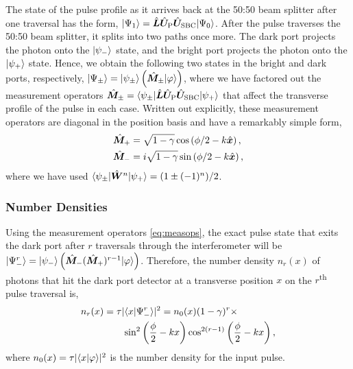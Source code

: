 The state of the pulse profile as it arrives back at the 50:50 beam splitter after one traversal has the form, $\lvert \Psi_1\rangle = \hat{\bm L}\hat{\bm U}_{\text{P}}\hat{\bm U}_{\text{SBC}}\lvert \Psi_0\rangle$.  After the pulse traverses the 50:50 beam splitter, it splits into two paths once more.  The dark port projects the photon onto the $\lvert \psi_-\rangle$ state, and the bright port projects the photon onto the $\lvert \psi_+\rangle$ state.  Hence, we obtain the following two states in the bright and dark ports, respectively, $\lvert \Psi_\pm\rangle = \lvert \psi_\pm\rangle \left(\hat{\bm M}_\pm \lvert \varphi\rangle \right)$, where we have factored out the measurement operators $\hat{\bm M}_\pm = \langle \psi_\pm \rvert \hat{\bm L} \hat{\bm U}_{\text{P}} \hat{\bm U}_{\text{SBC}} \lvert \psi_+\rangle$ that affect the transverse profile of the pulse in each case.  Written out explicitly, these measurement operators are diagonal in the position basis and have a remarkably simple form,
\begin{subequations}\label{eq:measops}
\begin{align}
  \hat{\bm M}_+ &= \sqrt{1-\gamma} \cos\left(\phi/2 - k\hat{\bm x}\right), \\
  \hat{\bm M}_- &= i \sqrt{1-\gamma} \sin\left(\phi/2 - k\hat{\bm x}\right), 
\end{align}
\end{subequations}
where we have used $\langle \psi_\pm \rvert\hat{\bm W}^n\lvert \psi_+\rangle = (1 \pm (-1)^n)/2$.

\subsubsection{Number Densities}\label{sec:number}
Using the measurement operators \eqref{eq:measops}, the exact pulse state that exits the dark port after $r$ traversals through the interferometer will be $\lvert \Psi^r_-\rangle = \lvert \psi_-\rangle \left(\hat{\bm M}_- (\hat{\bm M}_+)^{r-1} \lvert \varphi\rangle\right)$.  Therefore, the number density $n_r(x)$ of photons that hit the dark port detector at a transverse position $x$ on the $r$\textsuperscript{th} pulse traversal is,
\begin{align}\label{eq:nminus}
  n_r(x) &= \tau |\langle x \vert \Psi^r_- \rangle|^2 = n_0(x) (1-\gamma)^r \times \\
  &\qquad \sin^2\left(\frac{\phi}{2} - kx\right)\cos^{2(r-1)}\left(\frac{\phi}{2} - kx\right), \nonumber
\end{align}
where $n_0(x) = \tau |\langle x \vert \varphi \rangle|^2$ is the number density for the input pulse.

